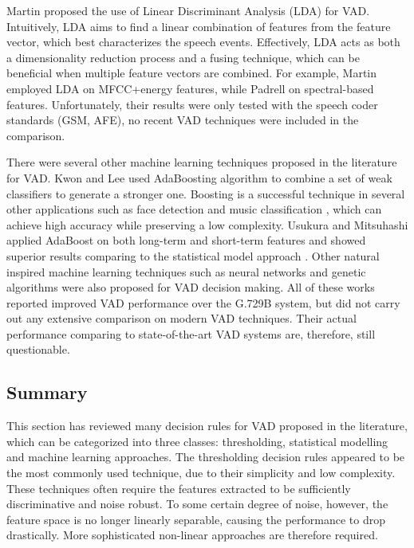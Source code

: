 Martin \etal \cite{martin2001robust,martin2006robust} proposed the use of Linear Discriminant Analysis (LDA) for VAD. Intuitively, LDA aims to find a linear combination of features from the feature vector, which best characterizes the speech events. Effectively, LDA acts as both a dimensionality reduction process and a fusing technique, which can be beneficial when multiple feature vectors are combined. For example, Martin \etal \cite{martin2001robust} employed LDA on MFCC+energy features, while Padrell \etal \cite{padrell2005robust} on spectral-based features. Unfortunately, their results were only tested with the speech coder standards (GSM, AFE), no recent VAD techniques were included in the comparison.

There were several other machine learning techniques proposed in the literature for VAD. Kwon and Lee \cite{kwon2003optimizing} used AdaBoosting algorithm \cite{schapire1999improved} to combine a set of weak classifiers to generate a stronger one. Boosting is a successful technique in several other applications such as face detection \cite{viola2001rapid} and music classification \cite{bergstra2006aggregate}, which can achieve high accuracy while preserving a low complexity. Usukura and Mitsuhashi \cite{usukura2008voice} applied AdaBoost on both long-term and short-term features and showed superior results comparing to the statistical model approach \cite{sohn1999statistical}. Other natural inspired machine learning techniques such as neural networks \cite{farsinejad2008model,pham2009using} and genetic algorithms \cite{estevez2005genetic,farsinejad2008new} were also proposed for VAD decision making. All of these works reported improved VAD performance over the G.729B system, but did not carry out any extensive comparison on modern VAD techniques. Their actual performance comparing to state-of-the-art VAD systems are, therefore, still questionable.

\subsection{Summary}
This section has reviewed many decision rules for VAD proposed in the literature, which can be categorized into three classes: thresholding, statistical modelling and machine learning approaches. The thresholding decision rules appeared to be the most commonly used technique, due to their simplicity and low complexity. These techniques often require the features extracted to be sufficiently discriminative and noise robust. To some certain degree of noise, however, the feature space is no longer linearly separable, causing the performance to drop drastically. More sophisticated non-linear approaches are therefore required.

